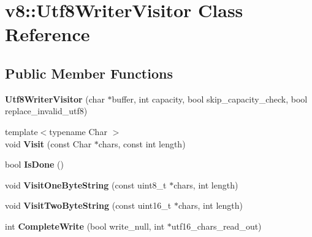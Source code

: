 \hypertarget{classv8_1_1_utf8_writer_visitor}{}\section{v8\+:\+:Utf8\+Writer\+Visitor Class Reference}
\label{classv8_1_1_utf8_writer_visitor}
\subsection*{Public Member Functions}
\begin{DoxyCompactItemize}
\item 
\hypertarget{classv8_1_1_utf8_writer_visitor_a3694f00cd1412b382316d2e5d4702a95}{}{\bfseries Utf8\+Writer\+Visitor} (char $\ast$buffer, int capacity, bool skip\+\_\+capacity\+\_\+check, bool replace\+\_\+invalid\+\_\+utf8)\label{classv8_1_1_utf8_writer_visitor_a3694f00cd1412b382316d2e5d4702a95}

\item 
\hypertarget{classv8_1_1_utf8_writer_visitor_a73670ab93ce35d25d59d586ed991c3f2}{}{\footnotesize template$<$typename Char $>$ }\\void {\bfseries Visit} (const Char $\ast$chars, const int length)\label{classv8_1_1_utf8_writer_visitor_a73670ab93ce35d25d59d586ed991c3f2}

\item 
\hypertarget{classv8_1_1_utf8_writer_visitor_af6feff57948c678630eff22c27b08ff4}{}bool {\bfseries Is\+Done} ()\label{classv8_1_1_utf8_writer_visitor_af6feff57948c678630eff22c27b08ff4}

\item 
\hypertarget{classv8_1_1_utf8_writer_visitor_a8853146988d0c7f9383c7efcbc243678}{}void {\bfseries Visit\+One\+Byte\+String} (const uint8\+\_\+t $\ast$chars, int length)\label{classv8_1_1_utf8_writer_visitor_a8853146988d0c7f9383c7efcbc243678}

\item 
\hypertarget{classv8_1_1_utf8_writer_visitor_adb4582dcbadea98625a7097edae60fff}{}void {\bfseries Visit\+Two\+Byte\+String} (const uint16\+\_\+t $\ast$chars, int length)\label{classv8_1_1_utf8_writer_visitor_adb4582dcbadea98625a7097edae60fff}

\item 
\hypertarget{classv8_1_1_utf8_writer_visitor_a3e5ed708404a4e97695ff679184c4fdd}{}int {\bfseries Complete\+Write} (bool write\+\_\+null, int $\ast$utf16\+\_\+chars\+\_\+read\+\_\+out)\label{classv8_1_1_utf8_writer_visitor_a3e5ed708404a4e97695ff679184c4fdd}

\end{DoxyCompactItemize}

